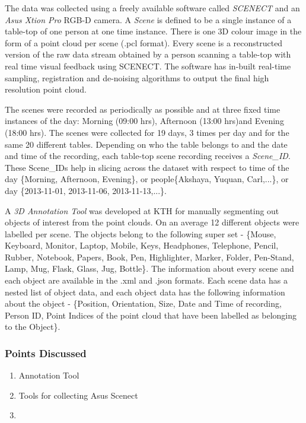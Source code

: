\documentclass[letterpaper, 10 pt, conference]{ieeeconf}  %
\begin{document}
The data was collected using a freely available software called \textit{SCENECT} \cite{} and an \textit{Asus Xtion Pro} RGB-D camera. A \textit{Scene} is defined to be a single instance of a table-top of one person at one time instance. There is one 3D colour image in the form of a point cloud per scene (.pcl format). Every scene is a reconstructed version of the raw data stream obtained by a person scanning a table-top with real time visual feedback using SCENECT. The software has in-built real-time sampling, registration and de-noising algorithms to output the final high resolution point cloud.

The scenes were recorded as periodically as possible and at three fixed time instances of the day: Morning (09:00 hrs), Afternoon (13:00 hrs)and Evening (18:00 hrs). The scenes were collected for 19 days, 3 times per day and for the same 20 different tables. Depending on who the table belongs to and the date and time of the recording, each table-top scene recording receives a \textit{Scene\_ID}. These Scene\_IDs help in slicing across the dataset with respect to time of the day \{Morning, Afternoon, Evening\}, or people\{Akshaya, Yuquan, Carl,...\}, or day \{2013-11-01, 2013-11-06, 2013-11-13,...\}.

A \textit{3D Annotation Tool} was developed at KTH for manually segmenting out objects of interest from the point clouds. On an average 12 different objects were labelled per scene. The objects belong to the following super set - \{Mouse, Keyboard, Monitor, Laptop, Mobile, Keys, Headphones, Telephone, Pencil, Rubber, Notebook, Papers,  Book, Pen, Highlighter, Marker, Folder, Pen-Stand, Lamp, Mug, Flask, Glass, Jug, Bottle\}. The information about every scene and each object are available in the .xml and .json formats. Each scene data has a nested list of object data, and each object data has the following information about the object - \{Position, Orientation, Size, Date and Time of recording, Person ID, Point Indices of the point cloud that have been labelled as belonging to the Object\}.
\subsubsection*{Points Discussed}
\begin{enumerate}
	\item Annotation Tool
	\item Tools for collecting Asus Scenect
	\item 
\end{enumerate}
\end{document}
